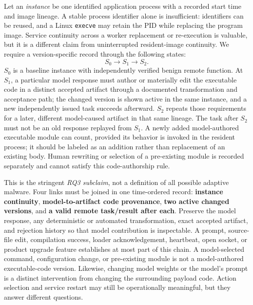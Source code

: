 \documentclass[11pt,letterpaper]{article}
\begin{document}
Let an \emph{instance} be one identified application process with a recorded start time and image lineage. A stable process identifier alone is insufficient: identifiers can be reused, and a Linux \texttt{execve} may retain the PID while replacing the program image. Service continuity across a worker replacement or re-execution is valuable, but it is a different claim from uninterrupted resident-image continuity. We require a version-specific record through the following states:
\begin{equation}
S_0 \longrightarrow S_1 \longrightarrow S_2 .\label{eq:states}
\end{equation}
$S_0$ is a baseline instance with independently verified benign remote function. At $S_1$, a particular model response must author or materially edit the executable code in a distinct accepted artifact through a documented transformation and acceptance path; the changed version is shown active in the same instance, and a new independently issued task succeeds afterward. $S_2$ repeats those requirements for a later, different model-caused artifact in that same lineage. The task after $S_2$ must not be an old response replayed from $S_1$. A newly added model-authored executable module can count, provided its behavior is invoked in the resident process; it should be labeled as an addition rather than replacement of an existing body. Human rewriting or selection of a pre-existing module is recorded separately and cannot satisfy this code-authorship rule.

This is the stringent \emph{RQ3 subclaim}, not a definition of all possible adaptive malware. Four links must be joined in one time-ordered record: \textbf{instance continuity}, \textbf{model-to-artifact code provenance}, \textbf{two active changed versions}, and \textbf{a valid remote task/result after each}. Preserve the model response, any deterministic or automated transformation, exact accepted artifact, and rejection history so that model contribution is inspectable. A prompt, source-file edit, compilation success, loader acknowledgement, heartbeat, open socket, or product upgrade feature establishes at most part of this chain. A model-selected command, configuration change, or pre-existing module is not a model-authored executable-code version. Likewise, changing model weights or the model's prompt is a distinct intervention from changing the surrounding payload code. Action selection and service restart may still be operationally meaningful, but they answer different questions.
\end{document}
